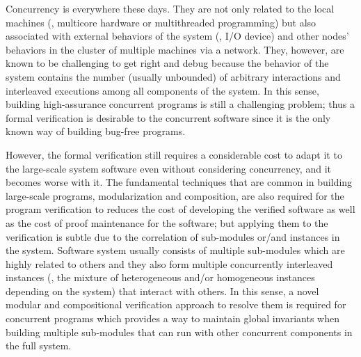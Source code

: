 Concurrency is everywhere these days. 
They are not only related to the local machines (\ie, multicore hardware or multithreaded programming)
but also associated with external behaviors of the system (\ie, I/O device) and other nodes' behaviors in the cluster of multiple machines via a network.
They, however, are known to be challenging to get right and debug because the behavior of the system contains the number (usually unbounded) of arbitrary interactions and interleaved executions among all components of the system. 
In this sense, building high-assurance concurrent programs is still a challenging problem;
thus a formal verification is desirable to the concurrent software since
 it is the only known way of building bug-free programs.

However, the formal verification still requires a considerable cost to adapt it to the large-scale system software even without considering concurrency, and it becomes worse with it. 
The fundamental techniques that are common in building large-scale programs, modularization and composition,
are also required for the program verification to reduces the cost of developing the verified software as well as the cost of proof maintenance for the software;
but applying them to the verification is subtle due to the correlation 
of sub-modules or/and instances in the system.
Software system usually consists of multiple sub-modules which are highly related to others
and they also form multiple concurrently interleaved instances (\ie, the mixture of heterogeneous and/or homogeneous instances depending on the system)
that interact with others.
In this sense, a novel modular and compositional verification approach to resolve them is required for concurrent programs
which provides a way to maintain global invariants when building multiple sub-modules that can run with 
other concurrent components in the full system.

